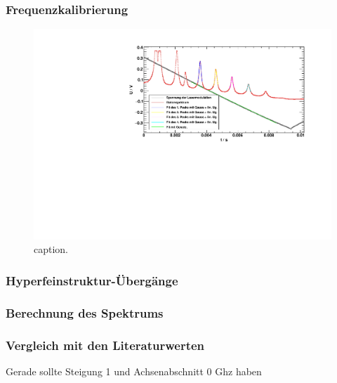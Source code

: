 \subsubsection*{Frequenzkalibrierung}
\begin{figure}[H]
\begin{center}
  \includegraphics[width=\textwidth]{../img/part2/down-etalon_zoom_fit.pdf}
  \caption{caption.}
  \label{img:etalon:fit:down}
\end{center}
\end{figure}

\subsubsection*{Hyperfeinstruktur-Übergänge}
\subsubsection*{Berechnung des Spektrums}
\subsubsection*{Vergleich mit den Literaturwerten}
Gerade sollte Steigung 1 und Achsenabschnitt 0 Ghz haben
